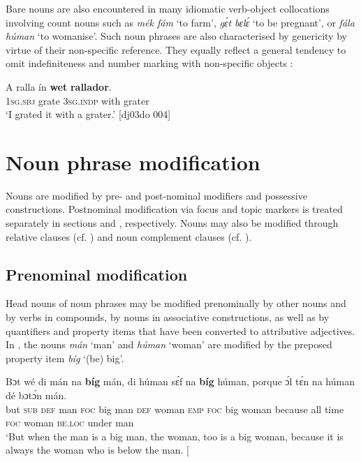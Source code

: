 Bare nouns are also encountered in many idiomatic verb-object collocations involving count nouns such as \textit{mék fám} ‘to farm’, \textit{gɛ́t bɛlɛ́} ‘to be pregnant’, or \textit{fála húman} ‘to womanise’. Such noun phrases are also characterised by genericity by virtue of their non-specific reference. They equally reflect a general tendency to omit indefiniteness and number marking with non-specific objects{\fff} : {\fff}


\ea%
    \label{ex:key:230}
    \gll \MakeUppercase{A}   ralla    ín    \textbf{wet}    \textbf{rallador}.\\
\textsc{1sg.sbj}  grate  \textsc{3sg.indp}  with    grater\\

\glt ‘I grated it with a grater.’ [dj03do 004]
\z

\section{Noun phrase modification}\label{sec:5.2}

Nouns are modified by pre- and post-nominal modifiers and possessive constructions. Postnominal modification via focus and topic markers is treated separately in sections  and , respectively. Nouns may also be modified through relative clauses (cf. ) and noun complement clauses (cf. ).

\subsection{Prenominal modification}\label{sec:5.2.1}

Head nouns of noun phrases may be modified prenominally by other nouns and by verbs in compounds, by nouns in associative constructions, as well as by quantifiers and property items that have been converted to attributive adjectives. In , the nouns \textit{mán} ‘man’ and \textit{húman} ‘woman’ are modified by the preposed property item \textit{bíg} ‘(be) big’. 


\ea%
    \label{ex:key:231}
    \gll Bɔt  wé  di  mán  na  \textbf{bíg}  mán,  di  húman  sɛ́f  na  \textbf{bíg}  húman,
porque  ɔ́l  tɛ́n  na  húman  dé    bɔtɔ́n  mán.\\
but  \textsc{sub}  \textsc{def}  man  \textsc{foc}  big  man    \textsc{def}  woman  \textsc{emp}  \textsc{foc}  big  woman
because  all  time  \textsc{foc}  woman  \textsc{be.loc}  under  man\\
\glt ‘But when the man is a big man, the woman, too is a big woman, because 
it is always the woman who is below the man. [\textstylePichiexamplenumberZchnZchn{hi03cb 152]}
\z


